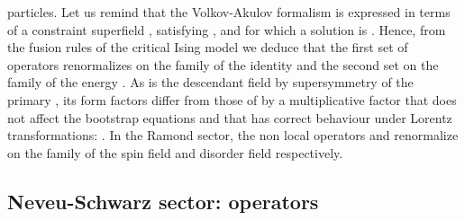 \documentclass[11pt,a4paper]{article}
\begin{document}
particles. Let us remind \cite{Ro} that the Volkov-Akulov
formalism is expressed in terms of a constraint superfield
\coordHE{}, satisfying \coordHE{}, and for
which a solution is \coordHE{}. Hence, from
the fusion rules of the critical Ising model \cite{BPZ} we deduce
that the first set of operators renormalizes on the family of the
identity and the second set on the family of the energy \myHighlight{$\epsilon$}\coordHE{}. As
\coordHE{} is the descendant field by
supersymmetry of the primary \coordHE{}, its form factors
differ from those of \coordHE{} by a multiplicative factor
that does not affect the bootstrap equations and that has correct
behaviour under Lorentz transformations:
\coordHE{}. In the Ramond sector, the non local operators \coordHE{} and \coordHE{} renormalize on the
family of the spin field and disorder field respectively.




\subsection{Neveu-Schwarz sector: operators \coordHE{}}
\end{document}
